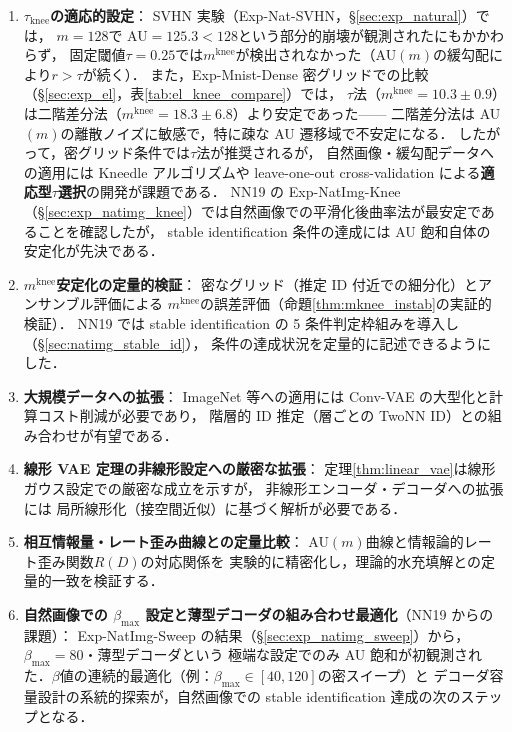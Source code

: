 \documentclass[11pt,a4paper]{jsarticle}
\newcommand{\mknee}{m^{\mathrm{knee}}}
\begin{document}
\begin{enumerate}
  \item \textbf{$\tau_{\mathrm{knee}}$の適応的設定}：
        SVHN 実験（Exp-Nat-SVHN，§\ref{sec:exp_natural}）では，
        $m = 128$で AU$= 125.3 < 128$という部分的崩壊が観測されたにもかかわらず，
        固定閾値$\tau = 0.25$では$\mknee$が検出されなかった（AU$(m)$の緩勾配により$r > \tau$が続く）．
        また，Exp-Mnist-Dense 密グリッドでの比較（§\ref{sec:exp_el}，表\ref{tab:el_knee_compare}）では，
        $\tau$法（$\mknee=10.3\pm0.9$）は二階差分法（$\mknee=18.3\pm6.8$）より安定であった——
        二階差分法は AU$(m)$の離散ノイズに敏感で，特に疎な AU 遷移域で不安定になる．
        したがって，密グリッド条件では$\tau$法が推奨されるが，
        自然画像・緩勾配データへの適用には Kneedle アルゴリズムや
        leave-one-out cross-validation による\textbf{適応型$\tau$選択}の開発が課題である．
        NN19 の Exp-NatImg-Knee（§\ref{sec:exp_natimg_knee}）では自然画像での平滑化後曲率法が最安定であることを確認したが，
        stable identification 条件の達成には AU 飽和自体の安定化が先決である．
  \item \textbf{$\mknee$安定化の定量的検証}：
        密なグリッド（推定 ID 付近での細分化）とアンサンブル評価による
        $\mknee$の誤差評価（命題\ref{thm:mknee_instab}の実証的検証）．
        NN19 では stable identification の 5 条件判定枠組みを導入し（§\ref{sec:natimg_stable_id}），
        条件の達成状況を定量的に記述できるようにした．
  \item \textbf{大規模データへの拡張}：
        ImageNet 等への適用には Conv-VAE の大型化と計算コスト削減が必要であり，
        階層的 ID 推定（層ごとの TwoNN ID）との組み合わせが有望である．
  \item \textbf{線形 VAE 定理の非線形設定への厳密な拡張}：
        定理\ref{thm:linear_vae}は線形ガウス設定での厳密な成立を示すが，
        非線形エンコーダ・デコーダへの拡張には
        局所線形化（接空間近似）に基づく解析が必要である．
  \item \textbf{相互情報量・レート歪み曲線との定量比較}：
        AU$(m)$曲線と情報論的レート歪み関数$R(D)$の対応関係を
        実験的に精密化し，理論的水充填解との定量的一致を検証する．
  \item \textbf{自然画像での $\beta_{\max}$ 設定と薄型デコーダの組み合わせ最適化}（NN19 からの課題）：
        Exp-NatImg-Sweep の結果（§\ref{sec:exp_natimg_sweep}）から，$\beta_{\max}=80$・薄型デコーダという
        極端な設定でのみ AU 飽和が初観測された．$\beta$値の連続的最適化（例：$\beta_{\max} \in [40,120]$の密スイープ）と
        デコーダ容量設計の系統的探索が，自然画像での stable identification 達成の次のステップとなる．
\end{enumerate}
\end{document}
